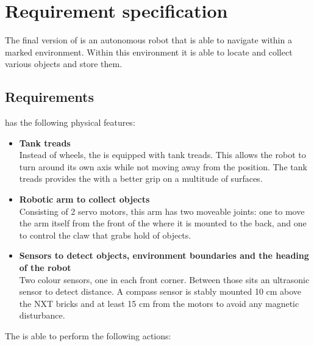 \section{Requirement specification} \label{sec:requirement_specification}

The final version of \projname{} is an autonomous robot that is able to navigate within a marked environment. Within this environment it is able to locate and collect various objects and store them.

\subsection{Requirements}

\projname{} has the following physical features:

\begin{itemize}
    \item \textbf{Tank treads}\\
        Instead of wheels, the \projname{} is equipped with tank treads. This allows the robot to turn around its own axis while not moving away from the position. The tank treads provides the \projname{} with a better grip on a multitude of surfaces.
    \item \textbf{Robotic arm to collect objects}\\
        Consisting of 2 servo motors, this arm has two moveable joints: one to move the arm itself from the front of the \projname{} where it is mounted to the back, and one to control the claw that grabs hold of objects.
    \item \textbf{Sensors to detect objects, environment boundaries and the heading of the robot}\\
        Two colour sensors, one in each front corner. Between those sits an ultrasonic sensor to detect distance. A compass sensor is stably mounted 10 cm above the NXT bricks and at least 15 cm from the motors to avoid any magnetic disturbance.
    \end{itemize}
    
The \projname{} is able to perform the following actions:


